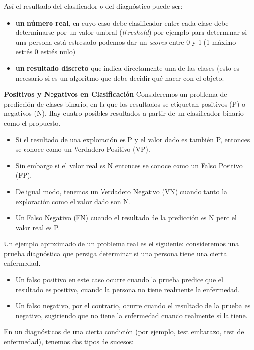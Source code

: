 \documentclass[]{book}
\providecommand{\tightlist}{%
  \setlength{\itemsep}{0pt}\setlength{\parskip}{0pt}}
\begin{document}
Así el resultado del clasificador o del diagnóstico puede ser:

\begin{itemize}
\tightlist
\item
  \textbf{un número real}, en cuyo caso debe clasificador entre cada clase debe determinarse por un valor umbral (\emph{threshold}) por ejemplo para determinar si una persona está estresado podemos dar un \emph{scores} entre 0 y 1 (1 máximo estrés 0 estrés nulo),
\item
  \textbf{un resultado discreto} que indica directamente una de las clases (esto es necesario si es un algoritmo que debe decidir qué hacer con el objeto.
\end{itemize}

\textbf{Positivos y Negativos en Clasificación}
Consideremos un problema de predicción de clases binario, en la que los resultados se etiquetan positivos (P) o negativos (N). Hay cuatro posibles resultados a partir de un clasificador binario como el propuesto.

\begin{itemize}
\tightlist
\item
  Si el resultado de una exploración es P y el valor dado es también P, entonces se conoce como un Verdadero Positivo (VP).
\item
  Sin embargo si el valor real es N entonces se conoce como un Falso Positivo (FP).
\item
  De igual modo, tenemos un Verdadero Negativo (VN) cuando tanto la exploración como el valor dado son N.
\item
  Un Falso Negativo (FN) cuando el resultado de la predicción es N pero el valor real es P.
\end{itemize}

Un ejemplo aproximado de un problema real es el siguiente: consideremos una prueba diagnóstica que persiga determinar si una persona tiene una cierta enfermedad.

\begin{itemize}
\tightlist
\item
  Un falso positivo en este caso ocurre cuando la prueba predice que el resultado es positivo, cuando la persona no tiene realmente la enfermedad.
\item
  Un falso negativo, por el contrario, ocurre cuando el resultado de la prueba es negativo, sugiriendo que no tiene la enfermedad cuando realmente sí la tiene.
\end{itemize}

En un diagnósticos de una cierta condición (por ejemplo, test embarazo, test de enfermedad), tenemos dos tipos de sucesos:
\end{document}
